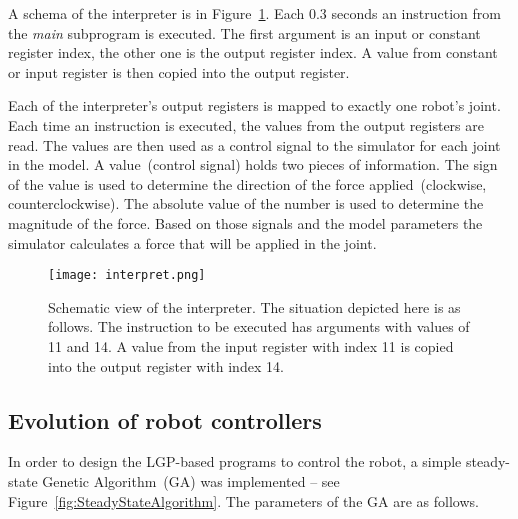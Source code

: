 \documentclass{ExcelAtFIT}
\begin{document}
{A schema of the interpreter is in Figure~\ref{fig:Interpret}.
Each 0.3 seconds an instruction from the \textit{main} subprogram is executed.
The first argument is an input or constant register index, the other one is the output register index.
A value from constant or input register is then copied into the output register.

Each of the interpreter's output registers is mapped to exactly one robot's joint.
Each time an instruction is executed, the values from the output registers are read.
The values are then used as a control signal to the simulator for each joint in the model.
A value~(control signal) holds two pieces of information.
The sign of the value is used to determine the direction of the force applied~(clockwise, counterclockwise).
The absolute value of the number is used to determine the magnitude of the force.
Based on those signals and the model parameters the simulator calculates a force that will be applied in the joint.

\begin{figure}[h]
	\centering
	{\texttt{[image: interpret.png]}}
	\caption{
	Schematic view of the interpreter.
	The situation depicted here is as follows.
	The instruction to be executed has arguments with values of 11 and 14.
	A value from the input register with index 11 is copied into the output register with index 14.
	}
	\label{fig:Interpret}
\end{figure}



\subsection{Evolution of robot controllers}
\label{sec:EvolutionOfRobotControllers}
In order to design the LGP-based programs to control the robot, a simple steady-state Genetic Algorithm~(GA) was implemented -- see Figure~\ref{fig:SteadyStateAlgorithm}.
The parameters of the GA are as follows.

}
\end{document}
